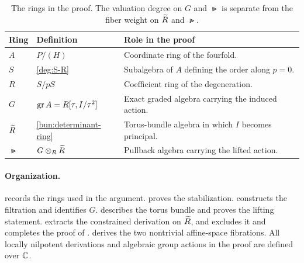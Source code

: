 \begin{table}[bp]
\centering
\small
\begin{tabular}{@{}llp{}@{}}
\toprule
Ring & Definition & Role in the proof\\
\midrule
$A$ & $P/(H)$ & Coordinate ring of the fourfold.\\
$S$ & \eqref{deg:S-R} & Subalgebra of $A$ defining the order along $p=0$.\\
$R$ & $S/pS$ & Coefficient ring of the degeneration.\\
$G$ & $\operatorname{gr} A=R[\tau,I/\tau^2]$ & Exact graded algebra carrying the induced action.\\
$\widetilde R$ & \eqref{bun:determinant-ring} & Torus-bundle algebra in which $I$ becomes principal.\\
$\Gt$ & $G\otimes_R\widetilde R$ & Pullback algebra carrying the lifted action.\\
\bottomrule
\end{tabular}
\caption{The rings in the proof. The valuation degree on $G$ and
$\Gt$ is separate from the fiber weight on $\widetilde R$ and $\Gt$.}
\label{tab:ring-dictionary}
\end{table}

\paragraph{Organization.}
 records the rings used in the argument.
 proves the stabilization.
 constructs the filtration and identifies $G$.
 describes the torus bundle and proves the lifting
statement.  extracts the constrained derivation on
$\widetilde R$, and  excludes it and completes the proof of
.  derives the two nontrivial
affine-space fibrations. All locally nilpotent derivations and algebraic group
actions in the proof are defined over $\mathbb C$.
